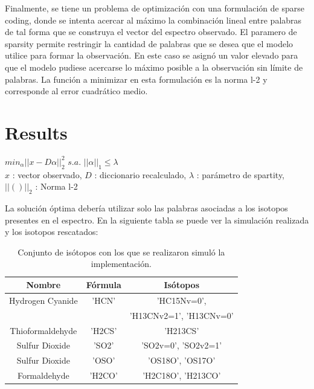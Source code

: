 \documentclass[twocolumn, draft]{emulateapj}
\begin{document}
Finalmente, se tiene un problema de optimización con una formulación de sparse coding, donde se intenta acercar  al máximo la combinación lineal entre palabras de tal forma que se construya el vector del espectro observado. El paramero de sparsity permite restringir la cantidad de palabras que se desea que el modelo utilice para formar la observación. En este caso se asignó un valor elevado para que el modelo pudiese acercarse lo máximo posible a la observación sin límite de palabras.  La función a minimizar en esta formulación es la norma l-2 y corresponde al error cuadrático medio.

\section{Results}
\label{sec:results}

\begin{center}
	$min_{\alpha} ||x-D\alpha||_2^2$ 
	$s.a.$ 
	$||\alpha||_1 \leq \lambda$ \\
	$x$ : vector observado, 
	$D$ : diccionario recalculado, 
	$\lambda$ : parámetro de spartity, 
	$||()||_2$ : Norma l-2
\end{center}


La solución óptima debería utilizar solo las palabras asociadas a los isotopos presentes en el espectro. En la siguiente tabla se puede ver la simulación realizada y los isotopos rescatados:

\begin {table}[H]
\begin{center}
	\begin{tabular}{|c|c|c|}
		\hline Nombre & Fórmula &  Isótopos \\ 
		
		
		\hline	Hydrogen Cyanide & 'HCN' & 'HC15Nv=0',\\
		&        &   'H13CNv2=1', 'H13CNv=0'\\ 
		
		\hline	Thioformaldehyde & 'H2CS' & 'H213CS' \\
		
		\hline	Sulfur Dioxide & 'SO2' & 'SO2v=0', 'SO2v2=1' \\
		
		\hline	Sulfur Dioxide & 'OSO' & 'OS18O', 'OS17O' \\
		
		\hline	Formaldehyde & 'H2CO'  & 'H2C18O', 'H213CO' \\
		
		\hline 
	\end{tabular}
	\caption {Conjunto de isótopos con los que se realizaron simuló la implementación.}
\end{center}
\end{table}
\end{document}
